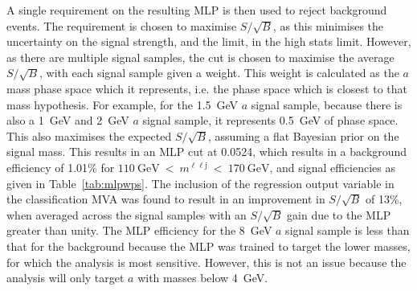 \documentclass[NOTE, atlasdraft=true, texlive=2017, UKenglish]{\ATLASLATEXPATH atlasdoc}
\begin{document}
A single requirement on the resulting MLP is then used to reject background events. The requirement is chosen to maximise $S/\sqrt{B}$, as this minimises the uncertainty on the signal strength, and the limit, in the high stats limit. However, as there are multiple signal samples, the cut is chosen to maximise the average $S/\sqrt{B}$, with each signal sample given a weight. This weight is calculated as the $a$ mass phase space which it represents, i.e. the phase space which is closest to that mass hypothesis. For example, for the 1.5~GeV $a$ signal sample, because there is also a 1~GeV and 2~GeV $a$ signal sample, it represents 0.5~GeV of phase space. This also maximises the expected $S/\sqrt{B}$, assuming a flat Bayesian prior on the signal mass. This results in an MLP cut at 0.0524, which results in a background efficiency of 1.01\% for $110\ \text{GeV}\ <\ m^{\ell\ell\text{j}}\ <\ 170\ \text{GeV}$, and signal efficiencies as given in Table~\ref{tab:mlpwps}. The inclusion of the regression output variable in the classification MVA was found to result in an improvement in $S/\sqrt{B}$ of 13\%, when averaged across the signal samples with an $S/\sqrt{B}$ gain due to the MLP greater than unity. The MLP efficiency for the 8~GeV $a$ signal sample is less than that for the background because the MLP was trained to target the lower masses, for which the analysis is most sensitive. However, this is not an issue because the analysis will only target $a$ with masses below 4~GeV. %
\end{document}
